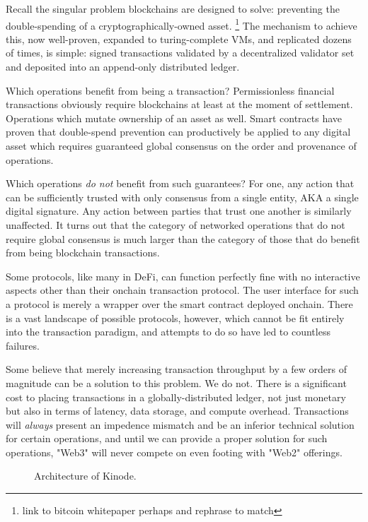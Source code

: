 \documentclass[runningheads]{llncs}
\begin{document}
Recall the singular problem blockchains are designed to solve: preventing the double-spending of a cryptographically-owned asset.
\footnote{link to bitcoin whitepaper perhaps and rephrase to match}
The mechanism to achieve this, now well-proven, expanded to turing-complete VMs, and replicated dozens of times, is simple: signed transactions validated by a decentralized validator set and deposited into an append-only distributed ledger.

Which operations benefit from being a transaction?
Permissionless financial transactions obviously require blockchains at least at the moment of settlement.
Operations which mutate ownership of an asset as well.
Smart contracts have proven that double-spend prevention can productively be applied to any digital asset which requires guaranteed global consensus on the order and provenance of operations.

Which operations \textit{do not} benefit from such guarantees?
For one, any action that can be sufficiently trusted with only consensus from a single entity, AKA a single digital signature.
Any action between parties that trust one another is similarly unaffected.
It turns out that the category of networked operations that do not require global consensus is much larger than the category of those that do benefit from being blockchain transactions.

Some protocols, like many in DeFi, can function perfectly fine with no interactive aspects other than their onchain transaction protocol.
The user interface for such a protocol is merely a wrapper over the smart contract deployed onchain.
There is a vast landscape of possible protocols, however, which cannot be fit entirely into the transaction paradigm, and attempts to do so have led to countless failures.

Some believe that merely increasing transaction throughput by a few orders of magnitude can be a solution to this problem.
We do not.
There is a significant cost to placing transactions in a globally-distributed ledger, not just monetary but also in terms of latency, data storage, and compute overhead.
Transactions will \textit{always} present an impedence mismatch and be an inferior technical solution for certain operations, and until we can provide a proper solution for such operations, "Web3" will never compete on even footing with "Web2" offerings.

\begin{figure}[H]
    \centering
    \caption{Architecture of Kinode.}
    \label{fig:triangle}
\end{figure}
\end{document}
